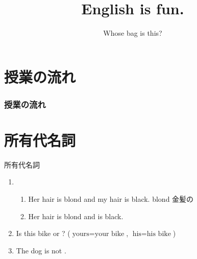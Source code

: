 \documentclass[aspectratio=169,xcolor={dvipsnames,table}]{beamer}
\title{English is fun.}
\subtitle{Whose bag is this?}
\author{}
\institute[]{}
\date[]
\begin{document}
\begin{frame}[plain]
  \titlepage
\end{frame}

\section*{授業の流れ}
\begin{frame}[plain]
  \frametitle{授業の流れ}
  \tableofcontents
\end{frame}
\section{所有代名詞}
\begin{frame}[plain]{所有代名詞}
 
\begin{enumerate}
 \item<1-> \begin{enumerate}
	\item<1-> Her hair is blond and my hair is black.%
\hfill{}{\scriptsize blond  金髪の}
	\item<2-> Her hair is blond and  is black. \visible<3->{($\text{mine} = \text{my hair}$)}
       \end{enumerate}
 \item<4-> Is this bike  or ?  {($\text{yours} = \text{your bike}$, $\text{his} = \text{his bike}$)}
 \item<6-> The dog is not . 
\end{enumerate}

\vfill


\hfill{\scriptsize {}}

\end{frame}
\end{document}
